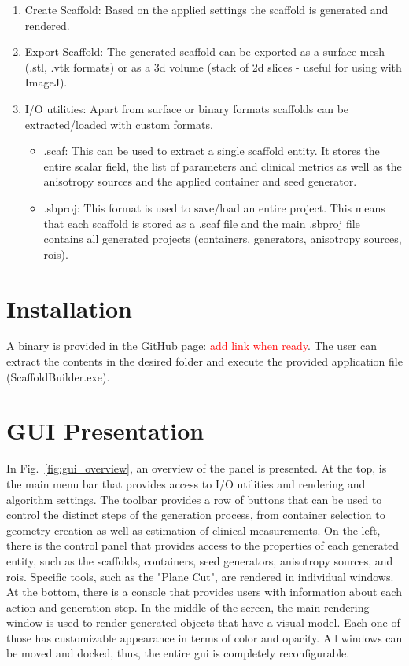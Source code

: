 \documentclass[11pt]{article}
\begin{document}
\begin{enumerate}
\item Create Scaffold: Based on the applied settings the scaffold is generated and rendered. 

\item Export Scaffold: The generated scaffold can be exported as a surface mesh (.stl, .vtk formats) or as a 3d volume (stack of 2d slices - useful for using with ImageJ).

\item I/O utilities: Apart from surface or binary formats scaffolds can be extracted/loaded with custom formats.
\begin{itemize}
    \item .scaf: This can be used to extract a single scaffold entity. It stores the entire scalar field, the list of parameters and clinical metrics as well as the anisotropy sources and the applied container and seed generator.
    \item .sbproj: This format is used to save/load an entire project. This means that each scaffold is stored as a .scaf file and the main .sbproj file contains all generated projects (containers, generators, anisotropy sources, \glspl{roi}).
\end{itemize}

\end{enumerate}

\section{Installation}

A binary is provided in the GitHub page: \textcolor{red}{add link when ready}. The user can extract the contents in the desired folder and execute the provided application file (ScaffoldBuilder.exe).

\section{GUI Presentation}

In Fig.~\ref{fig:gui_overview}, an overview of the panel is presented. At the top, is the main menu bar that provides access to I/O utilities and rendering and algorithm settings. The toolbar provides a row of buttons that can be used to control the distinct steps of the generation process, from container selection to geometry creation as well as estimation of clinical measurements. On the left, there is the control panel that provides access to the properties of each generated entity, such as the scaffolds, containers, seed generators, anisotropy sources, and \glspl{roi}. Specific tools, such as the "Plane Cut", are rendered in individual windows. At the bottom, there is a console that provides users with information about each action and generation step. In the middle of the screen, the main rendering window is used to render generated objects that have a visual model. Each one of those has customizable appearance in terms of color and opacity. All windows can be moved and docked, thus, the entire \gls{gui} is completely reconfigurable.
\end{document}
